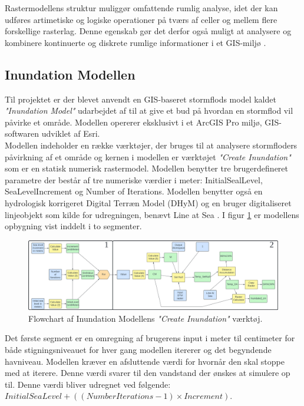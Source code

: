 Rastermodellens struktur muliggør omfattende rumlig analyse, idet der kan udføres artimetiske og logiske operationer på tværs af celler og mellem flere forskellige rasterlag. Denne egenskab gør det derfor også muligt at analysere og kombinere kontinuerte og diskrete rumlige informationer i et GIS-miljø \citep{bolstad_gis_2022, longley_geographical_2008}.

\subsection{Inundation Modellen} \label{Afsnit: Inundation Model}

Til projektet er der blevet anvendt en GIS-baseret stormflods model kaldet \textit{"Inundation Model"} udarbejdet af \cite{balstrom_kirby_inundation} til at give et bud på hvordan en stormflod vil påvirke et område. Modellen opererer eksklusivt i et ArcGIS Pro miljø, GIS-softwaren udviklet af Esri.\\
Modellen indeholder en række værktøjer, der bruges til at analysere stormfloders påvirkning af et område og kernen i modellen er værktøjet \textit{"Create Inundation"} som er en statisk numerisk rastermodel. Modellen benytter tre brugerdefineret parametre der består af tre numeriske værdier i meter: InitialSealLevel, SeaLevelIncrement og Number of Iterations. Modellen benytter også en hydrologisk korrigeret Digital Terræn Model (DHyM) og en bruger digitaliseret linjeobjekt som kilde for udregningen, benævt Line at Sea \citep{balstrom_kirby_inundation}. I figur \ref{Figur: Create Inundation} er modellens opbygning vist inddelt i to segmenter.

\begin{figure}[H]
    \centering
    \includegraphics[width=1\linewidth]{images/teori/inundation_model_separated.jpg}
    \caption{Flowchart af Inundation Modellens \textit{"Create Inundation"} værktøj.}
    \label{Figur: Create Inundation}
\end{figure}

Det første segment er en omregning af brugerens input i meter til centimeter for både stigningsniveauet for hver gang modellen itererer og det begyndende havniveau. Modellen kræver en afsluttende værdi for hvornår den skal stoppe med at iterere. Denne værdi svarer til den vandstand der ønskes at simulere op til. Denne værdi bliver udregnet ved følgende: $InitialSeaLevel + ((NumberIterations - 1)\times Increment)$. \\

